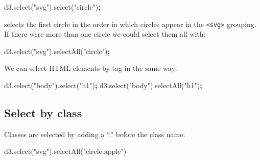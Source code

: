 \documentclass[openany]{book}
\newenvironment{Shaded}{\begin{snugshade}}{\end{snugshade}}
\newcommand{\AttributeTok}[1]{\textcolor[rgb]{0.77,0.63,0.00}{#1}}
\newcommand{\NormalTok}[1]{#1}
\newcommand{\OperatorTok}[1]{\textcolor[rgb]{0.81,0.36,0.00}{\textbf{#1}}}
\newcommand{\StringTok}[1]{\textcolor[rgb]{0.31,0.60,0.02}{#1}}
\newcommand{\VariableTok}[1]{\textcolor[rgb]{0.00,0.00,0.00}{#1}}
\begin{document}
\begin{Shaded}
\begin{Highlighting}[]
\VariableTok{d3}\NormalTok{.}\AttributeTok{select}\NormalTok{(}\StringTok{"svg"}\NormalTok{).}\AttributeTok{select}\NormalTok{(}\StringTok{"circle"}\NormalTok{)}\OperatorTok{;}
\end{Highlighting}
\end{Shaded}

selects the first circle in the order in which circles appear in the \texttt{\textless{}svg\textgreater{}} grouping. If there were more than one circle we could select them all with:

\begin{Shaded}
\begin{Highlighting}[]
\VariableTok{d3}\NormalTok{.}\AttributeTok{select}\NormalTok{(}\StringTok{"svg"}\NormalTok{).}\AttributeTok{selectAll}\NormalTok{(}\StringTok{"circle"}\NormalTok{)}\OperatorTok{;}
\end{Highlighting}
\end{Shaded}

We can select HTML elements by tag in the same way:

\begin{Shaded}
\begin{Highlighting}[]
\VariableTok{d3}\NormalTok{.}\AttributeTok{select}\NormalTok{(}\StringTok{"body"}\NormalTok{).}\AttributeTok{select}\NormalTok{(}\StringTok{"h1"}\NormalTok{)}\OperatorTok{;}
\VariableTok{d3}\NormalTok{.}\AttributeTok{select}\NormalTok{(}\StringTok{"body"}\NormalTok{).}\AttributeTok{selectAll}\NormalTok{(}\StringTok{"h1"}\NormalTok{)}\OperatorTok{;}
\end{Highlighting}
\end{Shaded}

\hypertarget{select-by-class}{%
\subsection{Select by class}\label{select-by-class}}

Classes are selected by adding a ``.'' before the class name:

\begin{Shaded}
\begin{Highlighting}[]
\VariableTok{d3}\NormalTok{.}\AttributeTok{select}\NormalTok{(}\StringTok{"svg"}\NormalTok{).}\AttributeTok{selectAll}\NormalTok{(}\StringTok{"circle.apple"}\NormalTok{)}
\end{Highlighting}
\end{Shaded}
\end{document}
